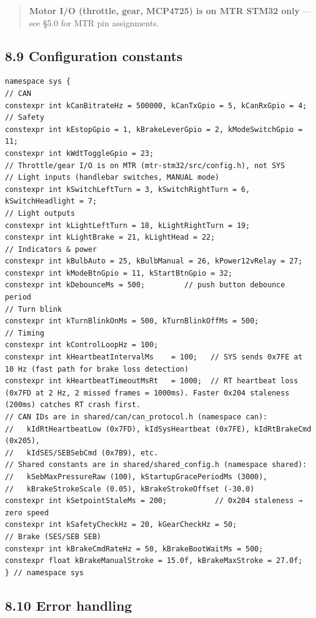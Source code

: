 \documentclass[12pt,a4paper,oneside]{report}
\begin{document}
\begin{quote}
\textbf{Motor I/O (throttle, gear, MCP4725) is on MTR STM32 only} --- see §5.0
for MTR pin assignments.
\end{quote}

\subsection{8.9 Configuration constants}\label{configuration-constants-1}

\begin{verbatim}
namespace sys {
// CAN
constexpr int kCanBitrateHz = 500000, kCanTxGpio = 5, kCanRxGpio = 4;
// Safety
constexpr int kEstopGpio = 1, kBrakeLeverGpio = 2, kModeSwitchGpio = 11;
constexpr int kWdtToggleGpio = 23;
// Throttle/gear I/O is on MTR (mtr-stm32/src/config.h), not SYS
// Light inputs (handlebar switches, MANUAL mode)
constexpr int kSwitchLeftTurn = 3, kSwitchRightTurn = 6, kSwitchHeadlight = 7;
// Light outputs
constexpr int kLightLeftTurn = 18, kLightRightTurn = 19;
constexpr int kLightBrake = 21, kLightHead = 22;
// Indicators & power
constexpr int kBulbAuto = 25, kBulbManual = 26, kPower12vRelay = 27;
constexpr int kModeBtnGpio = 11, kStartBtnGpio = 32;
constexpr int kDebounceMs = 500;         // push button debounce period
// Turn blink
constexpr int kTurnBlinkOnMs = 500, kTurnBlinkOffMs = 500;
// Timing
constexpr int kControlLoopHz = 100;
constexpr int kHeartbeatIntervalMs    = 100;   // SYS sends 0x7FE at 10 Hz (fast path for brake loss detection)
constexpr int kHeartbeatTimeoutMsRt   = 1000;  // RT heartbeat loss (0x7FD at 2 Hz, 2 missed frames = 1000ms). Faster 0x204 staleness (200ms) catches RT crash first.
// CAN IDs are in shared/can/can_protocol.h (namespace can):
//   kIdRtHeartbeatLow (0x7FD), kIdSysHeartbeat (0x7FE), kIdRtBrakeCmd (0x205),
//   kIdSES/SEBSebCmd (0x7B9), etc.
// Shared constants are in shared/shared_config.h (namespace shared):
//   kSebMaxPressureRaw (100), kStartupGracePeriodMs (3000),
//   kBrakeStrokeScale (0.05), kBrakeStrokeOffset (-30.0)
constexpr int kSetpointStaleMs = 200;           // 0x204 staleness → zero speed
constexpr int kSafetyCheckHz = 20, kGearCheckHz = 50;
// Brake (SES/SEB SEB)
constexpr int kBrakeCmdRateHz = 50, kBrakeBootWaitMs = 500;
constexpr float kBrakeManualStroke = 15.0f, kBrakeMaxStroke = 27.0f;
} // namespace sys
\end{verbatim}

\subsection{8.10 Error handling}\label{error-handling-1}
\end{document}
